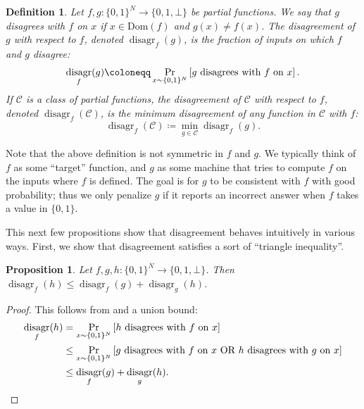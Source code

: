 \documentclass[10pt,a4paper]{article}
\newtheorem{definition}[theorem]{Definition}
\newtheorem{proposition}[theorem]{Proposition}
\newcommand{\Dom}{\mathrm{Dom}}
\DeclareMathOperator{\disagr}{\mathrm{disagr}}
\begin{document}
\begin{definition}
\label{def:disagreement}
Let $f, g: \{0,1\}^N \to \{0,1,\bot\}$ be partial functions. We say that \emph{$g$ disagrees with $f$ on $x$} if $x \in \Dom(f)$ and $g(x) \neq f(x)$. The \emph{disagreement of $g$ with respect to $f$}, denoted $\disagr_f(g)$, is the fraction of inputs on which $f$ and $g$ disagree:
\[\disagr_f(g) \coloneqq \Pr_{x \sim \{0,1\}^N} \left[ g \text{ \rm disagrees with } f \text{ \rm on } x \right].\]
If $\mathcal{C}$ is a class of partial functions, the \emph{disagreement of $\mathcal{C}$ with respect to $f$}, denoted $\disagr_f(\mathcal{C})$, is the minimum disagreement of any function in $\mathcal{C}$ with $f$:
\[
\disagr_f(\mathcal{C}) \coloneqq \min_{g \in \mathcal{C}} \disagr_f(g).
\]
\end{definition}

Note that the above definition is not symmetric in $f$ and $g$. We typically think of $f$ as some ``target'' function, and $g$ as some machine that tries to compute $f$ on the inputs where $f$ is defined. The goal is for $g$ to be consistent with $f$ with good probability; thus we only penalize $g$ if it reports an incorrect answer when $f$ takes a value in $\{0,1\}$.

This next few propositions show that disagreement behaves intuitively in various ways. First, we show that disagreement satisfies a sort of ``triangle inequality''.

\begin{proposition}
\label{prop:disagr_triangle_inequality}
Let $f, g, h: \{0,1\}^N \to \{0,1,\bot\}$. Then $\disagr_f(h) \le \disagr_f(g) + \disagr_g(h)$. 
\end{proposition}
\begin{proof}
This follows from  and a union bound:
\begin{align*}
\disagr_f(h) &= \Pr_{x \sim \{0,1\}^N} \left[ h \text{ \rm disagrees with } f \text{ \rm on } x \right]\\
&\le \Pr_{x \sim \{0,1\}^N} \left[ g \text{ \rm disagrees with } f \text{ \rm on } x \text{ \rm OR } h \text{ \rm disagrees with } g \text{ \rm on } x \right]\\
&\le \disagr_f(g) + \disagr_g(h).\qedhere
\end{align*}
\end{proof}
\end{document}

